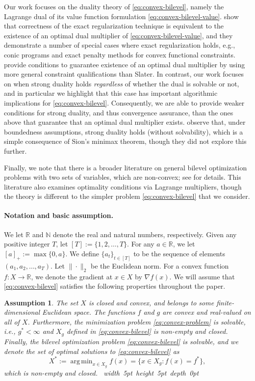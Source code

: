 \documentclass[11pt,oneside]{article}
\theoremstyle{plain}
\theoremstyle{plain}
\theoremstyle{plain}%
\newtheorem{assumption}{Assumption}%
\newcommand{\epr}{\hfill\hbox{\hskip 4pt \vrule width 5pt height 5pt depth 0pt}\vspace{0.0cm}\par}
\def\N{{\mathbb{N}}}
\def\R{{\mathbb{R}}}
\DeclareMathOperator*{\argmin}{arg\,min}
\begin{document}
{Our work focuses on the duality theory of \cref{eq:convex-bilevel}, namely the Lagrange dual of its value function formulation \cref{eq:convex-bilevel-value}. \citet{FriedlanderEtAl2008} show that correctness of the exact regularization technique is equivalent to the existence of an optimal dual multiplier of \cref{eq:convex-bilevel-value}, and they demonstrate a number of special cases where exact regularization holds, e.g., conic programs and exact penalty methods for convex functional constraints. \citet{DempeEtAl2010,FrankeEtAl2018} provide conditions to guarantee existence of an optimal dual multiplier by using more general constraint qualifications than Slater. In contrast, our work focuses on when strong duality holds \emph{regardless} of whether the dual is solvable or not, and in particular we highlight that this case has important algorithmic implications for \cref{eq:convex-bilevel}. Consequently, we are able to provide weaker conditions for strong duality, and thus convergence assurance, than the ones above that guarantee that an optimal dual multiplier exists. \citet{FriedlanderEtAl2008} observe that, under boundedness assumptions, strong duality holds (without solvability), which is a simple consequence of Sion's minimax theorem, though they did not explore this further.

Finally, we note that there is a broader literature on general bilevel optimization problems with two sets of variables, which are non-convex; see \citet{Dempe2002book} for details. This literature also examines optimality conditions via Lagrange multipliers, though the theory is different to the simpler problem \cref{eq:convex-bilevel} that we consider.

\paragraph{Notation and basic assumption.}
We let $\R$ and $\N$ denote the real and natural numbers, respectively. Given any positive integer $T$, let $[T] := \{1, 2, \dots, T\}$. For any $a\in\R$, we let $[a]_+:=\max\{0,a\}$. We define $\{a_t\}_{t\in[T]}$ to be the sequence of elements $(a_1, a_2, \dots, a_T)$. Let $\|\cdot\|_2$ be the Euclidean norm. For a convex function $f : X \to \R$, we denote the gradient at $x \in X$ by $\nabla f (x)$. We will assume that \cref{eq:convex-bilevel} satisfies the following properties throughout the paper.
\begin{assumption}\label{ass:basic}
The set $X$ is closed and convex, and belongs to some finite-dimensional Euclidean space. The functions $f$ and $g$ are convex and real-valued on all of $X$. Furthermore, the minimization problem \cref{eq:convex-problem} is solvable, i.e., $g^* < \infty$ and $X_g$ defined in \cref{eq:convex-bilevel} is non-empty and closed. Finally, the bilevel optimization problem \cref{eq:convex-bilevel} is solvable, and we denote the set of optimal solutions to \cref{eq:convex-bilevel} as
\[ X^* := \argmin_{x \in X_g} f(x) = \{ x \in X_g : f(x) = f^* \}, \]
which is non-empty and closed.
\epr
\end{assumption}

}
\end{document}
